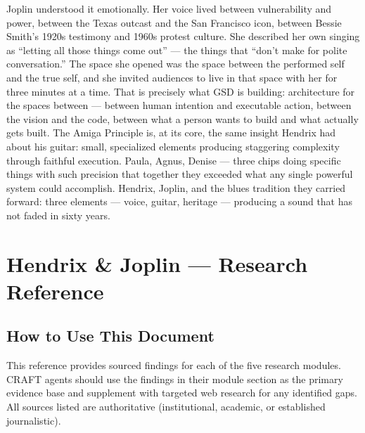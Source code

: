 \documentclass[11pt,letterpaper]{article}
\newcommand{\stageheader}[2]{%
  \noindent\colorbox{#2}{\makebox[\textwidth][l]{%
    \textcolor{white}{\bfseries\sffamily\hspace{6pt}#1\hspace{6pt}}}}%
  \vspace{0.5em}\par%
}
\begin{document}
Joplin understood it emotionally. Her voice lived between vulnerability and power, between the Texas outcast and the San Francisco icon, between Bessie Smith's 1920s testimony and 1960s protest culture. She described her own singing as ``letting all those things come out'' --- the things that ``don't make for polite conversation.'' The space she opened was the space between the performed self and the true self, and she invited audiences to live in that space with her for three minutes at a time. That is precisely what GSD is building: architecture for the spaces between --- between human intention and executable action, between the vision and the code, between what a person wants to build and what actually gets built. The Amiga Principle is, at its core, the same insight Hendrix had about his guitar: small, specialized elements producing staggering complexity through faithful execution. Paula, Agnus, Denise --- three chips doing specific things with such precision that together they exceeded what any single powerful system could accomplish. Hendrix, Joplin, and the blues tradition they carried forward: three elements --- voice, guitar, heritage --- producing a sound that has not faded in sixty years.

\newpage

\stageheader{STAGE 2 --- RESEARCH REFERENCE}{secondary}

\section{Hendrix \& Joplin --- Research Reference}

\subsection{How to Use This Document}

This reference provides sourced findings for each of the five research modules. CRAFT agents should use the findings in their module section as the primary evidence base and supplement with targeted web research for any identified gaps. All sources listed are authoritative (institutional, academic, or established journalistic).
\end{document}
